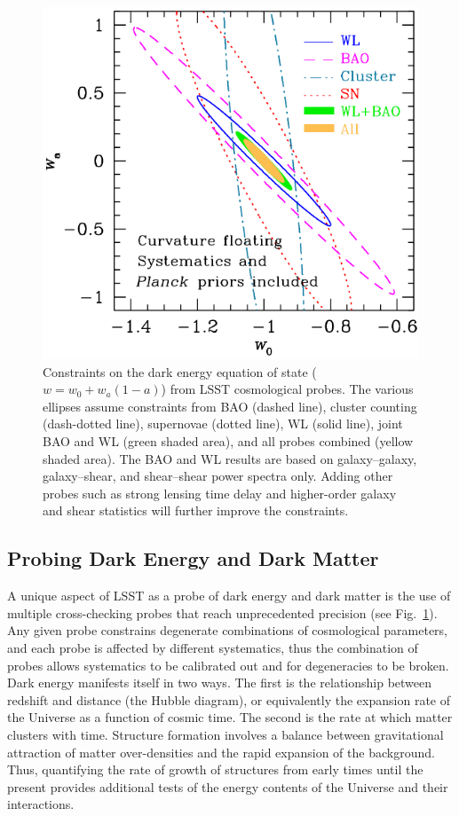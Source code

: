 \documentclass{emulateapj}
\begin{document}
\begin{figure}
\includegraphics[width=1.0\hsize,clip]{cswb.pdf}
\caption{
Constraints on the dark energy equation of state ($w = w_0 +
w_a(1-a)$) from LSST cosmological probes.  The various ellipses assume
constraints from BAO (dashed line), cluster counting (dash-dotted line), 
supernovae (dotted line), WL (solid line), joint BAO and WL 
(green shaded area), and all probes combined (yellow shaded area).
The BAO and WL results are based on galaxy--galaxy, galaxy--shear,
and shear--shear power spectra only. 
Adding other probes such as strong lensing time delay
and higher-order galaxy and shear statistics will further improve 
the constraints.} 
\label{Fig:DEellipses}
\end{figure}


\vskip 0.3in
\subsection{Probing Dark Energy and Dark Matter }

A unique aspect of LSST as a probe of dark energy and dark matter is
the use of multiple cross-checking probes that reach unprecedented
precision (see Fig.~\ref{Fig:DEellipses}). Any given probe constrains
degenerate combinations of cosmological parameters, and each probe is
affected by different systematics, thus the combination of probes
allows systematics to be calibrated out and for degeneracies to be
broken.  Dark energy manifests itself in two ways.  The first is the
relationship between redshift and distance (the Hubble diagram), or
equivalently the expansion rate of the Universe as a function of
cosmic time.  The second is the rate at which matter clusters with
time.  
Structure formation involves a balance between
gravitational attraction of matter over-densities and the rapid
expansion of the background.  Thus, quantifying the rate of growth of
structures from early times until the present provides additional
tests of the energy contents of the Universe and their interactions.
\end{document}
